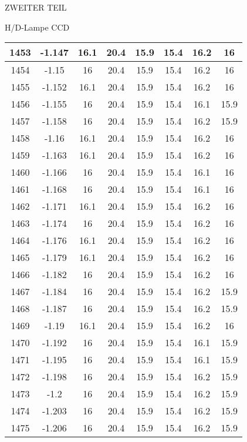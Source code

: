 \begin{appendix}
\begin{chapter}{ZWEITER TEIL}
\begin{section}{H/D-Lampe CCD}
\begin{scriptsize}
\begin{longtable}[htbp]{|c|c|c|c|c|c|c|c|}
            1453 & -1.147 & 16.1 & 20.4 & 15.9 & 15.4 & 16.2 & 16 \\ \hline
            1454 & -1.15 & 16 & 20.4 & 15.9 & 15.4 & 16.2 & 16 \\ \hline
            1455 & -1.152 & 16.1 & 20.4 & 15.9 & 15.4 & 16.2 & 16 \\ \hline
            1456 & -1.155 & 16 & 20.4 & 15.9 & 15.4 & 16.1 & 15.9 \\ \hline
            1457 & -1.158 & 16 & 20.4 & 15.9 & 15.4 & 16.2 & 15.9 \\ \hline
            1458 & -1.16 & 16.1 & 20.4 & 15.9 & 15.4 & 16.2 & 16 \\ \hline
            1459 & -1.163 & 16.1 & 20.4 & 15.9 & 15.4 & 16.2 & 16 \\ \hline
            1460 & -1.166 & 16 & 20.4 & 15.9 & 15.4 & 16.1 & 16 \\ \hline
            1461 & -1.168 & 16 & 20.4 & 15.9 & 15.4 & 16.1 & 16 \\ \hline
            1462 & -1.171 & 16.1 & 20.4 & 15.9 & 15.4 & 16.2 & 16 \\ \hline
            1463 & -1.174 & 16 & 20.4 & 15.9 & 15.4 & 16.2 & 16 \\ \hline
            1464 & -1.176 & 16.1 & 20.4 & 15.9 & 15.4 & 16.2 & 16 \\ \hline
            1465 & -1.179 & 16.1 & 20.4 & 15.9 & 15.4 & 16.2 & 16 \\ \hline
            1466 & -1.182 & 16 & 20.4 & 15.9 & 15.4 & 16.2 & 16 \\ \hline
            1467 & -1.184 & 16 & 20.4 & 15.9 & 15.4 & 16.2 & 15.9 \\ \hline
            1468 & -1.187 & 16 & 20.4 & 15.9 & 15.4 & 16.2 & 15.9 \\ \hline
            1469 & -1.19 & 16.1 & 20.4 & 15.9 & 15.4 & 16.2 & 16 \\ \hline
            1470 & -1.192 & 16 & 20.4 & 15.9 & 15.4 & 16.1 & 15.9 \\ \hline
            1471 & -1.195 & 16 & 20.4 & 15.9 & 15.4 & 16.1 & 15.9 \\ \hline
            1472 & -1.198 & 16 & 20.4 & 15.9 & 15.4 & 16.2 & 15.9 \\ \hline
            1473 & -1.2 & 16 & 20.4 & 15.9 & 15.4 & 16.2 & 15.9 \\ \hline
            1474 & -1.203 & 16 & 20.4 & 15.9 & 15.4 & 16.2 & 15.9 \\ \hline
            1475 & -1.206 & 16 & 20.4 & 15.9 & 15.4 & 16.2 & 15.9 \\ \hline

\end{longtable}
\end{scriptsize}
\end{section}
\end{chapter}
\end{appendix}
